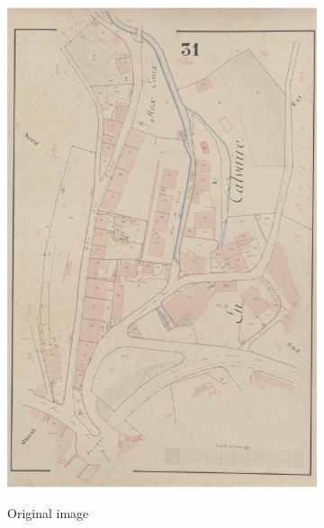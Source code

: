 \documentclass[12pt]{article}
\begin{document}
\begin{figure}[H]
	\begin{subfigure}[b]{.32\textwidth}
		\centering
		\includegraphics[width=1\linewidth]{images/original_image2.png}  
		\label{fig:original-img}
		\caption{Original image}
	\end{subfigure}
	\begin{subfigure}[b]{.32\textwidth}
		\centering

\end{subfigure}
\end{figure}
\end{document}
